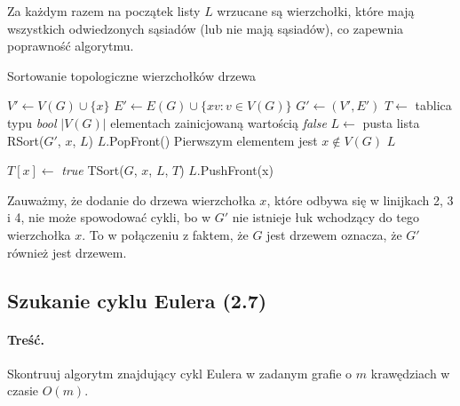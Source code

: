 Za każdym razem na początek listy $L$ wrzucane są wierzchołki, 
które mają wszystkich odwiedzonych sąsiadów (lub nie mają sąsiadów),
co zapewnia poprawność algorytmu.

\begin{algorithm}[H]
	\caption{Sortowanie topologiczne wierzchołków drzewa}
	\begin{algorithmic}[1]
		\State $V' \gets V(G) \cup \{x\}$
		\State $E' \gets E(G) \cup \{xv : v \in V(G)\}$
		\State $G' \gets (V', E')$
		\State $T \gets$ tablica typu \textit{bool} $|V(G)|$ elementach zainicjowaną wartością 
		\textit{false}
		\State $L \gets$ pusta lista
		\State RSort($G'$, $x$, $L$)
		\State $L$.PopFront() \Comment Pierwszym elementem jest $x \not \in V(G)$
		\State \Return $L$
		\EndProcedure
		
		\State $T[x] \gets$ \textit{true}
		\State TSort($G$, $x$, $L$, $T$)
		\EndIf
		\EndWhile
		\State $L$.PushFront(x)
		\EndProcedure
	\end{algorithmic}
	\label{alg:Zadanie26}
\end{algorithm}

Zauważmy, że dodanie do drzewa wierzchołka $x$, które odbywa się w linijkach 2, 3 i 4, nie może spowodować
cykli, bo w $G'$ nie istnieje łuk wchodzący do tego wierzchołka $x$. To w połączeniu z faktem, 
że $G$ jest drzewem oznacza, że $G'$ również jest drzewem.

\subsection{Szukanie cyklu Eulera (2.7)}
\paragraph{Treść.} Skontruuj algorytm znajdujący cykl Eulera 
w zadanym grafie o $m$ krawędziach w czasie $O(m)$.

